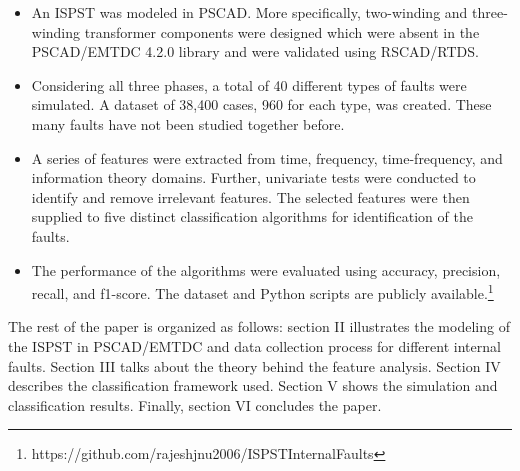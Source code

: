\documentclass[conference]{IEEEtran}
\begin{document}
\begin{itemize}
    \item An ISPST was modeled in PSCAD. More specifically, two-winding and three-winding transformer components were designed which were absent in the PSCAD/EMTDC 4.2.0 library and were validated using RSCAD/RTDS.
    
    \item Considering all three phases, a total of 40 different types of faults were simulated. A dataset of 38,400 cases, 960 for each type, was created. These many faults have not been studied together before.
    
    \item A series of features were extracted from time, frequency, time-frequency, and information theory domains. Further, univariate tests were conducted to identify and remove irrelevant features. The selected features were then supplied to five distinct classification algorithms for identification of the faults. 
    
    \item The performance of the algorithms were evaluated using accuracy, precision, recall, and f1-score. The dataset and Python scripts are publicly available.\footnote{https://github.com/rajeshjnu2006/ISPSTInternalFaults}
    
\end{itemize}

The rest of the paper is organized as follows: section II illustrates the modeling of the ISPST in PSCAD/EMTDC and data collection process for different internal faults. Section III talks about the theory behind the feature analysis. Section IV describes the classification framework used. Section V shows the simulation and classification results. Finally, section VI concludes the paper. 
\end{document}
